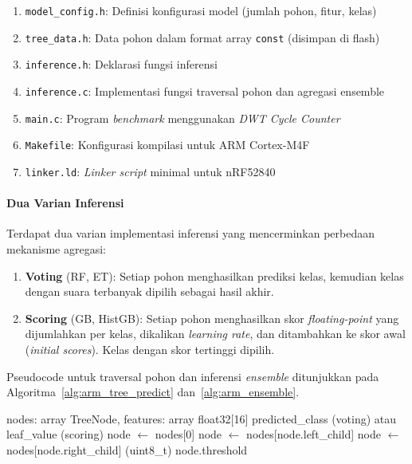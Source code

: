 \begin{enumerate}
    \item \texttt{model\_config.h}: Definisi konfigurasi model (jumlah pohon, fitur, kelas)
    \item \texttt{tree\_data.h}: Data pohon dalam format array \texttt{const} (disimpan di flash)
    \item \texttt{inference.h}: Deklarasi fungsi inferensi
    \item \texttt{inference.c}: Implementasi fungsi traversal pohon dan agregasi ensemble
    \item \texttt{main.c}: Program \textit{benchmark} menggunakan \textit{DWT Cycle Counter}
    \item \texttt{Makefile}: Konfigurasi kompilasi untuk ARM Cortex-M4F
    \item \texttt{linker.ld}: \textit{Linker script} minimal untuk nRF52840
\end{enumerate}

\paragraph{Dua Varian Inferensi}
Terdapat dua varian implementasi inferensi yang mencerminkan perbedaan mekanisme agregasi:

\begin{enumerate}
    \item \textbf{Voting} (RF, ET): Setiap pohon menghasilkan prediksi kelas, kemudian kelas dengan suara terbanyak dipilih sebagai hasil akhir.
    \item \textbf{Scoring} (GB, HistGB): Setiap pohon menghasilkan skor \textit{floating-point} yang dijumlahkan per kelas, dikalikan \textit{learning rate}, dan ditambahkan ke skor awal (\textit{initial scores}). Kelas dengan skor tertinggi dipilih.
\end{enumerate}

Pseudocode untuk traversal pohon dan inferensi \textit{ensemble} ditunjukkan pada Algoritma~\ref{alg:arm_tree_predict} dan~\ref{alg:arm_ensemble}.

\begin{algorithm}[htbp]
\caption{Traversal Pohon Keputusan Float32 pada ARM Cortex-M4F}
\label{alg:arm_tree_predict}
\begin{algorithmic}[1]
\REQUIRE nodes: array TreeNode, features: array float32[16]
\ENSURE predicted\_class (voting) atau leaf\_value (scoring)
\STATE node $\leftarrow$ nodes[0]
        \STATE node $\leftarrow$ nodes[node.left\_child] 
    \ELSE
        \STATE node $\leftarrow$ nodes[node.right\_child]
    \ENDIF
\ENDWHILE
\RETURN (uint8\_t) node.threshold 
\end{algorithmic}
\end{algorithm}

